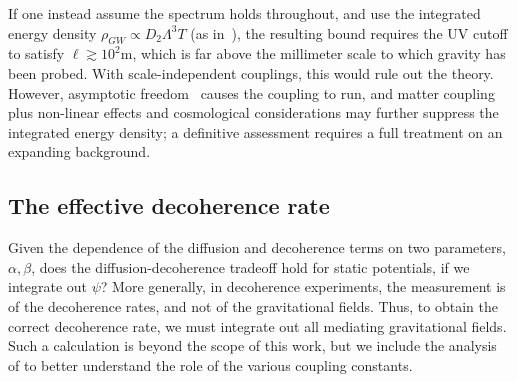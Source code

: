\documentclass[aps,preprintnumbers,superscriptaddress,longbibliography]{revtex4-1}
\begin{document}
If one instead assume the spectrum holds throughout, and use the integrated energy density $\rho_{GW}\propto D_2\Lambda^3 T$ (as in~\cite{oppenheim2025diffusion}), the resulting bound requires the UV cutoff to satisfy $\ell\gtrsim 10^{2}\mathrm{m}$, which is far above the millimeter scale to which gravity has been probed. With scale-independent couplings, this would rule out the theory. However, asymptotic freedom~\cite{grudka2024renormalisation} causes the coupling to run, and matter coupling plus non-linear effects and cosmological considerations may further suppress the integrated energy density; a definitive assessment requires a full treatment on an expanding background.




\subsection{The effective decoherence rate}
\label{effective}

Given the dependence of the diffusion and decoherence terms on two parameters, $\alpha,\beta$, does the diffusion-decoherence tradeoff hold for static potentials, if we integrate out $\psi$? More generally, in decoherence experiments, the measurement is of the decoherence rates, and not of the gravitational fields. Thus, to obtain the correct decoherence rate, we must integrate out all mediating gravitational fields. Such a calculation is beyond the scope of this work, but we include the analysis of \cite{oppenheim2026non} to better understand the role of the various coupling constants.
\end{document}
